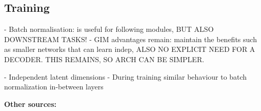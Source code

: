 \subsection{Training}
	- Batch normalisation: is useful for following modules, BUT ALSO DOWNSTREAM TASKS!
	- GIM advantages remain: maintain the benefits such as smaller networks that can learn indep, ALSO NO EXPLICIT NEED FOR A DECODER. THIS REMAINS, SO ARCH CAN BE SIMPLER.
	

	- Independent latent dimensions
	- During training similar behaviour to batch normalization in-between layers







\textbf{Other sources:} \\











%


